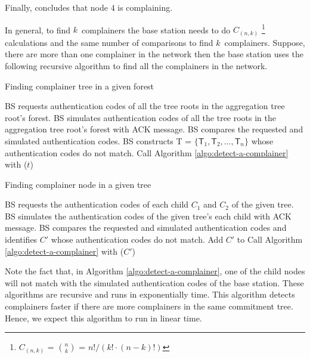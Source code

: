 		Finally, concludes that node $4 $ is complaining.
		
		In general, to find $k$\ complainers the base station needs to do $C_{(n,k)}$ \footnote{$C_{(n,k)}$ = $ n \choose k$ = $n!/(k! \cdot (n-k)!)$} calculations and the same number of comparisons to find $k$\ complainers.
		Suppose, there are more than one complainer in the network then the base station uses the following recursive algorithm to find all the complainers in the network.
		
		\begin{algorithm}
			\caption{Finding complainer tree in a given forest}
			\label{algo:detect-a-complainer-tree}
			\begin{algorithmic}[1]
				\STATE BS requests authentication codes of all the tree roots in the aggregation tree root's forest.
				\STATE BS simulates authentication codes of all the tree roots in the aggregation tree root's forest with ACK message.
				\STATE BS compares the requested and simulated authentication codes.
				\STATE BS constructs \textsf{T} = $\{\textsf{T}_{1},\textsf{T}_{2},\dotsc,\textsf{T}_{n}\}$ whose authentication codes do not match.
					\STATE Call Algorithm \ref{algo:detect-a-complainer} with ($t$)			
				\ENDFOR 
			\end{algorithmic}
		\end{algorithm}

		\begin{algorithm}
			\caption{Finding complainer node in a given tree}
			\label{algo:detect-a-complainer}
			\begin{algorithmic}[1]
				\STATE BS requests the authentication codes of each child $C_{1}$ and $C_{2}$ of the given tree.
				\STATE BS simulates the authentication codes of the given tree's each child with ACK message.
				\STATE BS compares the requested and simulated authentication codes and identifies $C'$ whose authentication codes do not match.
				\IF {$C'$ is a leaf vertex}
					\STATE Add $C'$ to \sf{C} 
				\ELSE
					\STATE Call Algorithm \ref{algo:detect-a-complainer} with ($C'$)			
				\ENDIF
			\end{algorithmic}
		\end{algorithm}
		Note the fact that, in Algorithm \ref{algo:detect-a-complainer}, one of the child nodes will not match with the simulated authentication codes of the base station.
		These algorithms are recursive and runs in exponentially time.
		This algorithm detects complainers faster if there are more complainers in the same commitment tree.
		Hence, we expect this algorithm to run in linear time.

